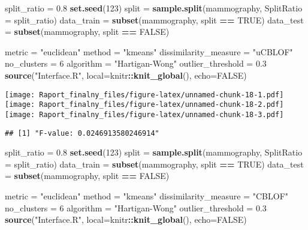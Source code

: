 \documentclass[
]{article}
\newenvironment{Shaded}{\begin{snugshade}}{\end{snugshade}}
\newcommand{\DataTypeTok}[1]{\textcolor[rgb]{0.13,0.29,0.53}{#1}}
\newcommand{\DecValTok}[1]{\textcolor[rgb]{0.00,0.00,0.81}{#1}}
\newcommand{\FloatTok}[1]{\textcolor[rgb]{0.00,0.00,0.81}{#1}}
\newcommand{\KeywordTok}[1]{\textcolor[rgb]{0.13,0.29,0.53}{\textbf{#1}}}
\newcommand{\NormalTok}[1]{#1}
\newcommand{\OperatorTok}[1]{\textcolor[rgb]{0.81,0.36,0.00}{\textbf{#1}}}
\newcommand{\OtherTok}[1]{\textcolor[rgb]{0.56,0.35,0.01}{#1}}
\newcommand{\StringTok}[1]{\textcolor[rgb]{0.31,0.60,0.02}{#1}}
\begin{document}
\begin{Shaded}
\begin{Highlighting}[]
\NormalTok{split_ratio =}\StringTok{ }\FloatTok{0.8}
\KeywordTok{set.seed}\NormalTok{(}\DecValTok{123}\NormalTok{)}
\NormalTok{split =}\StringTok{ }\KeywordTok{sample.split}\NormalTok{(mammography, }\DataTypeTok{SplitRatio =}\NormalTok{ split_ratio)}
\NormalTok{data_train =}\StringTok{ }\KeywordTok{subset}\NormalTok{(mammography, split }\OperatorTok{==}\StringTok{ }\OtherTok{TRUE}\NormalTok{)}
\NormalTok{data_test =}\StringTok{ }\KeywordTok{subset}\NormalTok{(mammography, split }\OperatorTok{==}\StringTok{ }\OtherTok{FALSE}\NormalTok{)}

\NormalTok{metric =}\StringTok{ "euclidean"}
\NormalTok{method =}\StringTok{ "kmeans"}
\NormalTok{dissimilarity_measure =}\StringTok{ "uCBLOF"}
\NormalTok{no_clusters =}\StringTok{ }\DecValTok{6}
\NormalTok{algorithm =}\StringTok{ "Hartigan-Wong"}
\NormalTok{outlier_threshold =}\StringTok{ }\FloatTok{0.3}
\KeywordTok{source}\NormalTok{(}\StringTok{"Interface.R"}\NormalTok{, }\DataTypeTok{local=}\NormalTok{knitr}\OperatorTok{::}\KeywordTok{knit_global}\NormalTok{(), }\DataTypeTok{echo=}\OtherTok{FALSE}\NormalTok{)}
\end{Highlighting}
\end{Shaded}

\texttt{[image: Raport\_finalny\_files/figure-latex/unnamed-chunk-18-1.pdf]}
\texttt{[image: Raport\_finalny\_files/figure-latex/unnamed-chunk-18-2.pdf]}
\texttt{[image: Raport\_finalny\_files/figure-latex/unnamed-chunk-18-3.pdf]}

\begin{verbatim}
## [1] "F-value: 0.0246913580246914"
\end{verbatim}

\begin{Shaded}
\begin{Highlighting}[]
\NormalTok{split_ratio =}\StringTok{ }\FloatTok{0.8}
\KeywordTok{set.seed}\NormalTok{(}\DecValTok{123}\NormalTok{)}
\NormalTok{split =}\StringTok{ }\KeywordTok{sample.split}\NormalTok{(mammography, }\DataTypeTok{SplitRatio =}\NormalTok{ split_ratio)}
\NormalTok{data_train =}\StringTok{ }\KeywordTok{subset}\NormalTok{(mammography, split }\OperatorTok{==}\StringTok{ }\OtherTok{TRUE}\NormalTok{)}
\NormalTok{data_test =}\StringTok{ }\KeywordTok{subset}\NormalTok{(mammography, split }\OperatorTok{==}\StringTok{ }\OtherTok{FALSE}\NormalTok{)}

\NormalTok{metric =}\StringTok{ "euclidean"}
\NormalTok{method =}\StringTok{ "kmeans"}
\NormalTok{dissimilarity_measure =}\StringTok{ "CBLOF"}
\NormalTok{no_clusters =}\StringTok{ }\DecValTok{6}
\NormalTok{algorithm =}\StringTok{ "Hartigan-Wong"}
\NormalTok{outlier_threshold =}\StringTok{ }\FloatTok{0.3}
\KeywordTok{source}\NormalTok{(}\StringTok{"Interface.R"}\NormalTok{, }\DataTypeTok{local=}\NormalTok{knitr}\OperatorTok{::}\KeywordTok{knit_global}\NormalTok{(), }\DataTypeTok{echo=}\OtherTok{FALSE}\NormalTok{)}
\end{Highlighting}
\end{Shaded}
\end{document}
